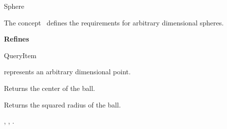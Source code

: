 

\begin{ccRefConcept}{Sphere}


\ccDefinition
  
The concept \ccRefName\ defines the requirements for arbitrary dimensional spheres.

{\bf Refines}

QueryItem

\ccParameters

 represents an arbitrary dimensional point.

\ccTypes






\ccOperations

{Returns the center of the ball.}


{Returns the squared radius of the ball.}


\ccHasModels

, , 
.



\end{ccRefConcept}


